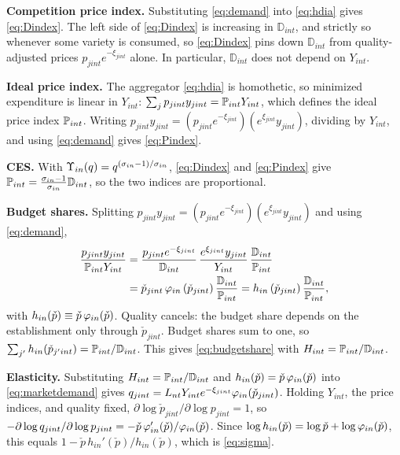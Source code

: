 \textbf{Competition price index.}
Substituting \eqref{eq:demand} into \eqref{eq:hdia} gives \eqref{eq:Dindex}.
The left side of \eqref{eq:Dindex} is increasing in $\mathbb{D}_{int}$, and strictly so whenever some variety is consumed, so \eqref{eq:Dindex} pins down $\mathbb{D}_{int}$ from quality-adjusted prices $p_{jint} e^{-\xi_{jint}}$ alone.
In particular, $\mathbb{D}_{int}$ does not depend on $Y_{int}$.

\textbf{Ideal price index.}
The aggregator \eqref{eq:hdia} is homothetic, so minimized expenditure is linear in $Y_{int}$: $\sum_j p_{jint} y_{jint} = \P_{int} Y_{int}$, which defines the ideal price index $\P_{int}$.
Writing $p_{jint} y_{jint} = (p_{jint} e^{-\xi_{jint}})(e^{\xi_{jint}} y_{jint})$, dividing by $Y_{int}$, and using \eqref{eq:demand} gives \eqref{eq:Pindex}.

\textbf{CES.}
With $\Upsilon_{in}(q) = q^{(\s_{in}-1)/\s_{in}}$, \eqref{eq:Dindex} and \eqref{eq:Pindex} give $\P_{int} = \frac{\s_{in} - 1}{\s_{in}} \mathbb{D}_{int}$, so the two indices are proportional.

\textbf{Budget shares.}
Splitting $p_{jint} y_{jint} = (p_{jint} e^{-\xi_{jint}})(e^{\xi_{jint}} y_{jint})$ and using \eqref{eq:demand},
\begin{align*}
	\frac{p_{jint} y_{jint}}{\P_{int} Y_{int}}
	&= \frac{p_{jint} e^{-\xi_{jint}}}{\mathbb{D}_{int}} \, \frac{e^{\xi_{jint}} y_{jint}}{Y_{int}} \, \frac{\mathbb{D}_{int}}{\P_{int}} \\
	&= \check{p}_{jint} \, \vp_{in}\left(\check{p}_{jint}\right) \frac{\mathbb{D}_{int}}{\P_{int}}
	= h_{in}\left(\check{p}_{jint}\right) \frac{\mathbb{D}_{int}}{\P_{int}},
\end{align*}
with $h_{in}(\check{p}) \equiv \check{p}\,\vp_{in}(\check{p})$.
Quality cancels: the budget share depends on the establishment only through $\check{p}_{jint}$.
Budget shares sum to one, so $\sum_{j'} h_{in}(\check{p}_{j'int}) = \P_{int}/\mathbb{D}_{int}$.
This gives \eqref{eq:budgetshare} with $H_{int} = \P_{int}/\mathbb{D}_{int}$.

\textbf{Elasticity.}
Substituting $H_{int} = \P_{int}/\mathbb{D}_{int}$ and $h_{in}(\check{p}) = \check{p}\,\vp_{in}(\check{p})$ into \eqref{eq:marketdemand} gives $q_{jint} = L_{nt} Y_{int} e^{-\xi_{jint}} \vp_{in}(\check{p}_{jint})$.
Holding $Y_{int}$, the price indices, and quality fixed, $\partial \log \check{p}_{jint}/\partial \log p_{jint} = 1$, so $-\partial \log q_{jint}/\partial \log p_{jint} = -\check{p}\,\vp_{in}'(\check{p})/\vp_{in}(\check{p})$.
Since $\log h_{in}(\check{p}) = \log \check{p} + \log \vp_{in}(\check{p})$, this equals $1 - \check{p}\, h_{in}'(\check{p})/h_{in}(\check{p})$, which is \eqref{eq:sigma}.

